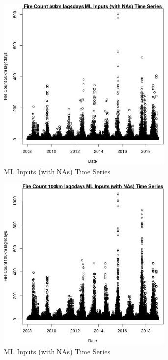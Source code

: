 \begin{figure} 
\centering  
\includegraphics[width=0.77\textwidth]{Code_Outputs/Report_ML_input_PM25_Step4_part_f_de_duplicated_aves_prioritize_24hr_obswNAs_Fire_Count_50km_lag4daysvDate.jpg} 
\caption{\label{fig:Report_ML_input_PM25_Step4_part_f_de_duplicated_aves_prioritize_24hr_obswNAsFire_Count_50km_lag4daysvDate}ML Inputs (with NAs) Time Series} 
\end{figure} 
 

\begin{figure} 
\centering  
\includegraphics[width=0.77\textwidth]{Code_Outputs/Report_ML_input_PM25_Step4_part_f_de_duplicated_aves_prioritize_24hr_obswNAs_Fire_Count_100km_lag4daysvDate.jpg} 
\caption{\label{fig:Report_ML_input_PM25_Step4_part_f_de_duplicated_aves_prioritize_24hr_obswNAsFire_Count_100km_lag4daysvDate}ML Inputs (with NAs) Time Series} 
\end{figure} 
 

